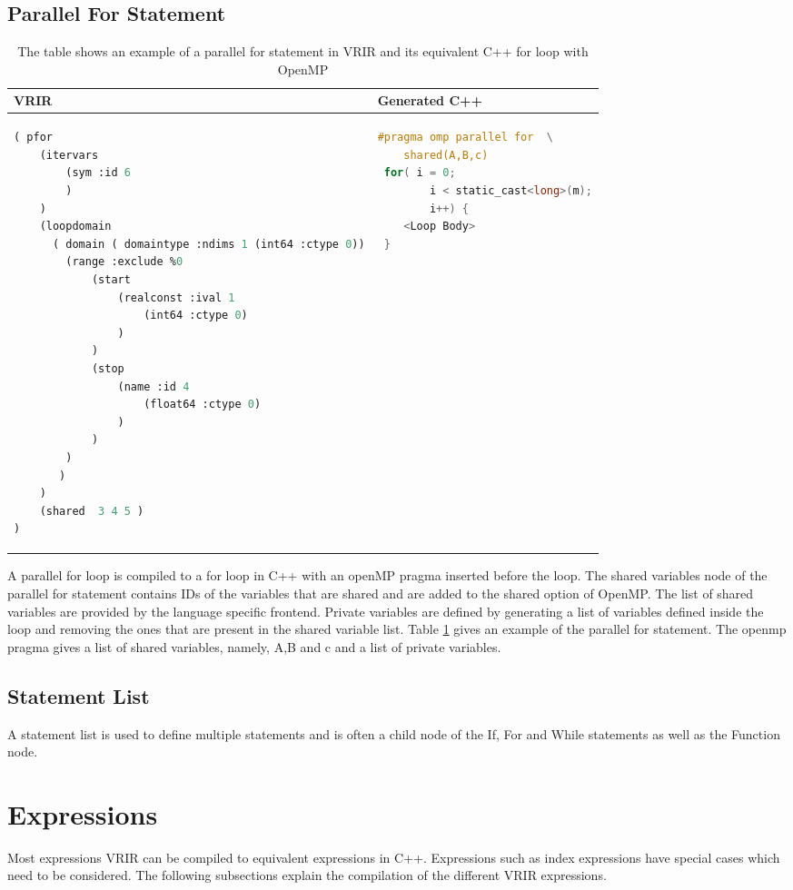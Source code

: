 \subsection{Parallel For Statement}
\begin{table}[htbp]
\centering
\begin{tabular}{|l|l|}
\hline

VRIR &  Generated C++ \\
\hline
{
\begin{lstlisting}[language=lisp,frame=none, numbers=none]
( pfor
	(itervars 
		(sym :id 6 
		)
	)
	(loopdomain 
	  ( domain ( domaintype :ndims 1 (int64 :ctype 0))
		(range :exclude %0 
   			(start  
   				(realconst :ival 1
					(int64 :ctype 0)
				)
			)
			(stop  
   				(name :id 4 
					(float64 :ctype 0)
				)
			)
		)
	   )
	)
	(shared  3 4 5 )
)
\end{lstlisting}
}
&
{
\begin{lstlisting}[language=c,frame=none, numbers=none]
#pragma omp parallel for  \
	shared(A,B,c)
 for( i = 0; 
		i < static_cast<long>(m);
		i++) {
	<Loop Body>
 }

\end{lstlisting}
} \\
\hline
\end{tabular}
\caption[Parallel For example]{The table shows an example of a parallel for statement in VRIR and its equivalent C++ for loop with OpenMP}
\label{tab:pForStmt}
\end{table}
A parallel for loop is compiled to a for loop  in C++ with an openMP pragma inserted before the loop. The shared variables node of the parallel for statement contains IDs of the variables that are shared and are added to the shared option of OpenMP. The list of shared variables are provided by the language specific frontend. Private variables are defined by generating a list of variables defined inside the loop and removing the ones that are present in the shared variable list. Table \ref{tab:pForStmt} gives an example of the parallel for statement. The openmp pragma gives a list of shared variables, namely, A,B and c and a list of private variables.
\subsection{Statement List}
A statement list is used to define multiple statements and is often a child node of the If, For and While statements as well as the Function node.
\section{Expressions}
Most expressions VRIR can be compiled to equivalent expressions in C++. Expressions such as index expressions have special cases which need to be considered. The following subsections explain the compilation of the different VRIR expressions.
